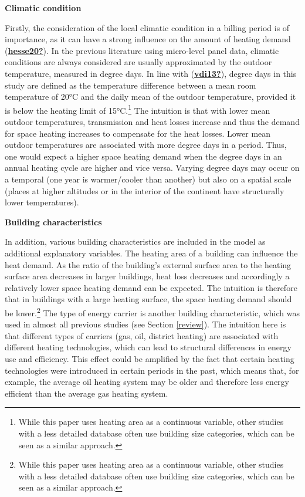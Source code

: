 \documentclass[12pt,twoside]{reedthesis}
\begin{document}
\textbf{Climatic condition}

Firstly, the consideration of the local climatic condition in a billing period is of importance, as it can have a strong influence on the amount of heating demand (\protect\hyperlink{ref-hesse20}{\textbf{hesse20?}}). In the previous literature using micro-level panel data, climatic conditions are always considered are usually approximated by the outdoor temperature, measured in degree days. In line with (\protect\hyperlink{ref-vdi13}{\textbf{vdi13?}}), degree days in this study are defined as the temperature difference between a mean room temperature of 20°C and the daily mean of the outdoor temperature, provided it is below the heating limit of 15°C.\footnote{While this paper uses heating area as a continuous variable, other studies with a less detailed database often use building size categories, which can be seen as a similar approach.} The intuition is that with lower mean outdoor temperatures, transmission and heat losses increase and thus the demand for space heating increases to compensate for the heat losses. Lower mean outdoor temperatures are associated with more degree days in a period. Thus, one would expect a higher space heating demand when the degree days in an annual heating cycle are higher and vice versa. Varying degree days may occur on a temporal (one year is warmer/cooler than another) but also on a spatial scale (places at higher altitudes or in the interior of the continent have structurally lower temperatures).

\textbf{Building characteristics}

In addition, various building characteristics are included in the model as additional explanatory variables. The heating area of a building can influence the heat demand. As the ratio of the building's external surface area to the heating surface area decreases in larger buildings, heat loss decreases and accordingly a relatively lower space heating demand can be expected. The intuition is therefore that in buildings with a large heating surface, the space heating demand should be lower.\footnote{While this paper uses heating area as a continuous variable, other studies with a less detailed database often use building size categories, which can be seen as a similar approach.} The type of energy carrier is another building characteristic, which was used in almost all previous studies (see Section \ref{review}). The intuition here is that different types of carriers (gas, oil, district heating) are associated with different heating technologies, which can lead to structural differences in energy use and efficiency. This effect could be amplified by the fact that certain heating technologies were introduced in certain periods in the past, which means that, for example, the average oil heating system may be older and therefore less energy efficient than the average gas heating system.
\end{document}
